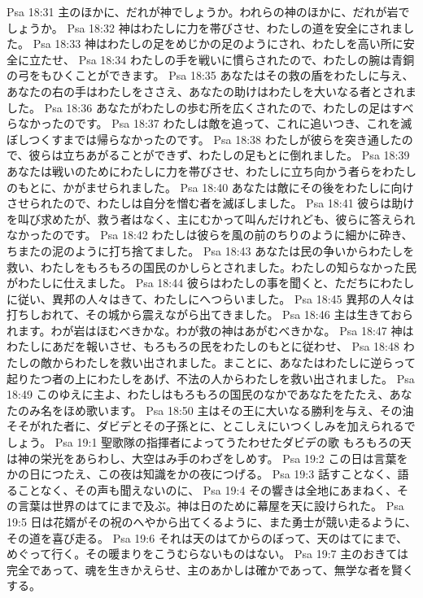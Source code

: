 Psa 18:31  主のほかに、だれが神でしょうか。われらの神のほかに、だれが岩でしょうか。
Psa 18:32  神はわたしに力を帯びさせ、わたしの道を安全にされました。
Psa 18:33  神はわたしの足をめじかの足のようにされ、わたしを高い所に安全に立たせ、
Psa 18:34  わたしの手を戦いに慣らされたので、わたしの腕は青銅の弓をもひくことができます。
Psa 18:35  あなたはその救の盾をわたしに与え、あなたの右の手はわたしをささえ、あなたの助けはわたしを大いなる者とされました。
Psa 18:36  あなたがわたしの歩む所を広くされたので、わたしの足はすべらなかったのです。
Psa 18:37  わたしは敵を追って、これに追いつき、これを滅ぼしつくすまでは帰らなかったのです。
Psa 18:38  わたしが彼らを突き通したので、彼らは立ちあがることができず、わたしの足もとに倒れました。
Psa 18:39  あなたは戦いのためにわたしに力を帯びさせ、わたしに立ち向かう者らをわたしのもとに、かがませられました。
Psa 18:40  あなたは敵にその後をわたしに向けさせられたので、わたしは自分を憎む者を滅ぼしました。
Psa 18:41  彼らは助けを叫び求めたが、救う者はなく、主にむかって叫んだけれども、彼らに答えられなかったのです。
Psa 18:42  わたしは彼らを風の前のちりのように細かに砕き、ちまたの泥のように打ち捨てました。
Psa 18:43  あなたは民の争いからわたしを救い、わたしをもろもろの国民のかしらとされました。わたしの知らなかった民がわたしに仕えました。
Psa 18:44  彼らはわたしの事を聞くと、ただちにわたしに従い、異邦の人々はきて、わたしにへつらいました。
Psa 18:45  異邦の人々は打ちしおれて、その城から震えながら出てきました。
Psa 18:46  主は生きておられます。わが岩はほむべきかな。わが救の神はあがむべきかな。
Psa 18:47  神はわたしにあだを報いさせ、もろもろの民をわたしのもとに従わせ、
Psa 18:48  わたしの敵からわたしを救い出されました。まことに、あなたはわたしに逆らって起りたつ者の上にわたしをあげ、不法の人からわたしを救い出されました。
Psa 18:49  このゆえに主よ、わたしはもろもろの国民のなかであなたをたたえ、あなたのみ名をほめ歌います。
Psa 18:50  主はその王に大いなる勝利を与え、その油そそがれた者に、ダビデとその子孫とに、とこしえにいつくしみを加えられるでしょう。
Psa 19:1  聖歌隊の指揮者によってうたわせたダビデの歌 もろもろの天は神の栄光をあらわし、大空はみ手のわざをしめす。
Psa 19:2  この日は言葉をかの日につたえ、この夜は知識をかの夜につげる。
Psa 19:3  話すことなく、語ることなく、その声も聞えないのに、
Psa 19:4  その響きは全地にあまねく、その言葉は世界のはてにまで及ぶ。神は日のために幕屋を天に設けられた。
Psa 19:5  日は花婿がその祝のへやから出てくるように、また勇士が競い走るように、その道を喜び走る。
Psa 19:6  それは天のはてからのぼって、天のはてにまで、めぐって行く。その暖まりをこうむらないものはない。
Psa 19:7  主のおきては完全であって、魂を生きかえらせ、主のあかしは確かであって、無学な者を賢くする。
